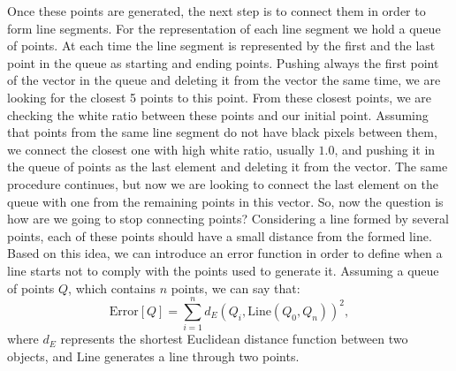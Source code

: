 \documentclass[	DIV=calc,%
							paper=a4,%
							fontsize=9pt,%
							twocolumn]{scrartcl}	 					%
\begin{document}
Once these points are generated, the next step is to connect them in order to form line segments. For the representation of each line segment we hold a queue of points. At each time the line segment is represented by the first and the last point in the queue as starting and ending points. Pushing always the first point of the vector in the queue and deleting it from the vector the same time, we are looking for the closest 5 points to this point. From these closest points, we are checking the white ratio between these points and our initial point. %
Assuming that points from the same line segment do not have black pixels between them, we connect the closest one with high white ratio, usually $1.0$, and pushing it in the queue of points as the last element and deleting it from the vector. The same procedure continues, but now we are looking to connect the last element on the queue with one from the remaining points in this vector. So, now the question is how are we going to stop connecting points? Considering a line formed by several points, each of these points should have a small distance from the formed line. Based on this idea, we can introduce an error function in order to define when a line starts not to comply with the points used to generate it. Assuming a queue of points $Q$, which contains $n$ points, we can say that:
\begin{equation}
  \label{eq:error}
  \mbox{Error}[Q] = \sum_{i=1}^{n}d_E\left(Q_i, \mbox{Line}\left(Q_0, Q_n\right)\right)^2,
\end{equation}
where $d_E$ represents the shortest Euclidean distance function between two objects, and $\mbox{Line}$ generates a line through two points.
\end{document}

